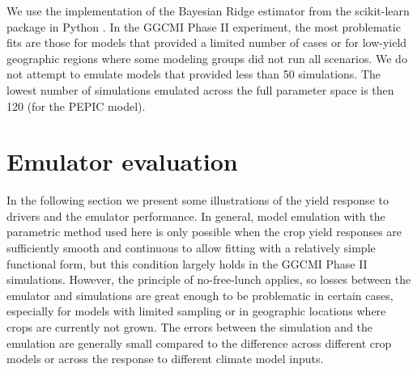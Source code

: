 \documentclass[gmd, manuscript]{copernicus} %
\begin{document}
We use the implementation of the Bayesian Ridge estimator from the scikit-learn package in Python \citep{scikit-learn}. 
In the GGCMI Phase II experiment, the most problematic fits are those for models that provided a limited number of cases or for low-yield geographic regions where some modeling groups did not run all scenarios. 
We do not attempt to emulate models that provided less than 50 simulations. 
The lowest number of simulations emulated across the full parameter space is then 120 (for the PEPIC model). 

\section{Emulator evaluation}
\label{S:4}
In the following section we present some illustrations of the yield response to drivers and the emulator performance. 
In general, model emulation with the parametric method used here is only possible when the crop yield responses are sufficiently smooth and continuous to allow fitting with a relatively simple functional form, but this condition largely holds in the GGCMI Phase II simulations. 
However, the principle of no-free-lunch applies, so losses between the emulator and simulations are great enough to be problematic in certain cases, especially for models with limited sampling or in geographic locations where crops are currently not grown. 
The errors between the simulation and the emulation are generally small compared to the difference across different crop models or across the response to different climate model inputs.
\end{document}
